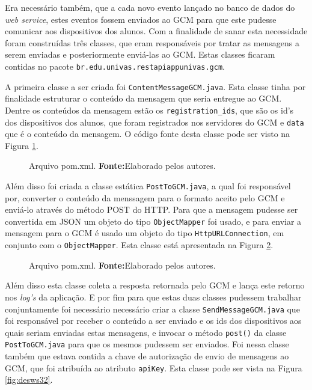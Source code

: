 	\pagebreak
	
	\par Era necessário também, que a cada novo evento lançado no banco de dados do
\textit{web service}, estes eventos fossem enviados ao GCM para que este pudesse
comunicar aos dispositivos dos alunos. Com a finalidade de sanar esta
necessidade foram construídas três classes, que eram responsáveis por tratar as
mensagens a serem enviadas e posteriormente enviá-las ao GCM. Estas classes
ficaram contidas no pacote \texttt{br.edu.univas.restapiappunivas.gcm}. 



	\par A primeira classe a ser criada foi \texttt{ContentMessageGCM.java}. Esta
classe tinha por finalidade estruturar o conteúdo da mensagem que seria
entregue ao GCM. Dentre os conteúdos da mensagem estão os
\texttt{registration\_ids}, que são os id's dos dispositivos dos alunos, que
foram registrados nos servidores do GCM e \texttt{data} que é o conteúdo da
mensagem. O código fonte desta classe pode ser visto na Figura
\ref{fig:desws30}.

	\begin{figure}[h!]
		
		\caption[Arquivo \texttt{pom.xml}]{Arquivo pom.xml.
		\textbf{Fonte:}Elaborado pelos autores.}
		\label{fig:desws30}
	\end{figure}

	
	\par Além disso foi criada a classe estática \texttt{PostToGCM.java}, a qual
foi responsável por, converter o conteúdo da menssagem para o formato aceito
pelo GCM e enviá-lo através do método POST do HTTP. Para que a mensagem pudesse
ser convertida em JSON um objeto do tipo \texttt{ObjectMapper} foi usado, e
para enviar a mensagem para o GCM é usado um objeto do tipo
\texttt{HttpURLConnection}, em conjunto com o \texttt{ObjectMapper}. Esta classe
está apresentada na Figura \ref{fig:desws31}.

	\begin{figure}[h!]
		
		\caption[Arquivo \texttt{pom.xml}]{Arquivo pom.xml.
		\textbf{Fonte:}Elaborado pelos autores.}
		\label{fig:desws31}
	\end{figure}
	
	\pagebreak
	
	\par Além disso esta classe coleta a resposta retornada pelo GCM e lança este
retorno nos \textit{log's} da aplicação. E por fim para que estas duas classes
pudessem trabalhar conjuntamente foi necessário necessário criar a classe
\texttt{SendMessageGCM.java} que foi responsável por receber o conteúdo a ser
enviado e os ids dos dispositivos aos quais seriam enviadas estas mensagens, e
invocar o método \texttt{post()} da classe \texttt{PostToGCM.java} para que os
mesmos pudessem ser enviados. Foi nessa classe também que estava contida a
chave de autorização de envio de mensagens ao GCM, que foi atribuída ao
atributo \texttt{apiKey}. Esta classe pode ser vista na Figura
\ref{fig:desws32}.

